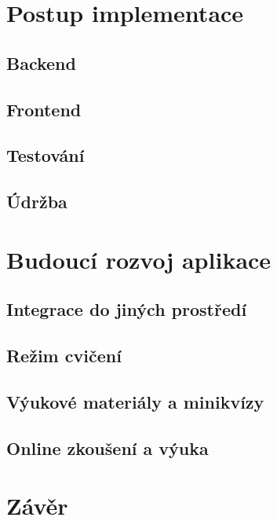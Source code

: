 \documentclass[14pt,a4paper]{article}
\begin{document}
	\section{Postup implementace}
        \subsection{Backend}
        \subsection{Frontend}
        \subsection{Testování}
        \subsection{Údržba}
        
	\section{Budoucí rozvoj aplikace}
        \subsection{Integrace do jiných prostředí}
        \subsection{Režim cvičení}
        \subsection{Výukové materiály a minikvízy}
        \subsection{Online zkoušení a výuka}
	
	\section{Závěr}
	
	

\printbibliography
\end{document}
